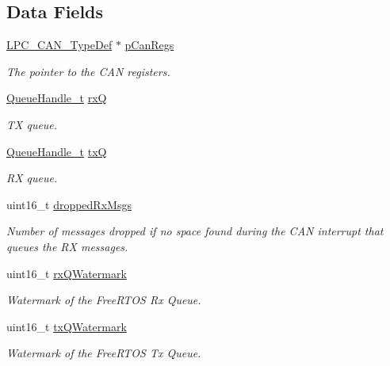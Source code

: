 \subsection*{Data Fields}
\begin{DoxyCompactItemize}
\item 
\hyperlink{structLPC__CAN__TypeDef}{L\+P\+C\+\_\+\+C\+A\+N\+\_\+\+Type\+Def} $\ast$ \hyperlink{structcan__struct__t_ac1798cad8cd1b75402e953a7cc5d2b50}{p\+Can\+Regs}
\begin{DoxyCompactList}\small\item\em The pointer to the C\+AN registers. \end{DoxyCompactList}\item 
\hyperlink{queue_8h_aaf19d499892a4ce1409326ece00f5264}{Queue\+Handle\+\_\+t} \hyperlink{structcan__struct__t_a1a1c2bdb829e45a31cafa44620d4bdd0}{rxQ}
\begin{DoxyCompactList}\small\item\em TX queue. \end{DoxyCompactList}\item 
\hyperlink{queue_8h_aaf19d499892a4ce1409326ece00f5264}{Queue\+Handle\+\_\+t} \hyperlink{structcan__struct__t_a39cfcc33222d5607be5ad2dd1d92e7cd}{txQ}
\begin{DoxyCompactList}\small\item\em RX queue. \end{DoxyCompactList}\item 
uint16\+\_\+t \hyperlink{structcan__struct__t_a2e7319422bed45d0521764d1f6644ae1}{dropped\+Rx\+Msgs}
\begin{DoxyCompactList}\small\item\em Number of messages dropped if no space found during the C\+AN interrupt that queues the RX messages. \end{DoxyCompactList}\item 
uint16\+\_\+t \hyperlink{structcan__struct__t_ac4f9dd16c31c2a75d97e1310d414345d}{rx\+Q\+Watermark}
\begin{DoxyCompactList}\small\item\em Watermark of the Free\+R\+T\+OS Rx Queue. \end{DoxyCompactList}\item 
uint16\+\_\+t \hyperlink{structcan__struct__t_ac7b27780bb731be3afddf397c3a02c15}{tx\+Q\+Watermark}
\begin{DoxyCompactList}\small\item\em Watermark of the Free\+R\+T\+OS Tx Queue. \end{DoxyCompactList}\item 

\end{DoxyCompactItemize}
